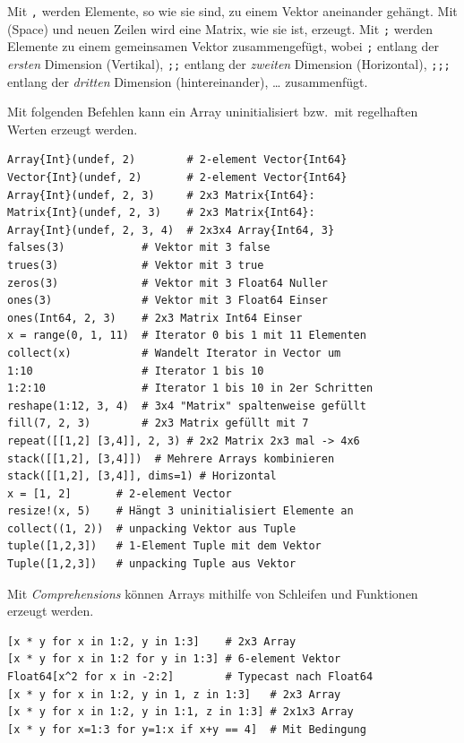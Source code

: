 \documentclass[10pt,twocolumn]{scrartcl}
\begin{document}
Mit \lstinline|,| werden Elemente, so wie sie sind, zu einem Vektor aneinander
gehängt. Mit \lstinline| | (Space) und neuen Zeilen wird eine Matrix, wie sie
ist, erzeugt. Mit \lstinline|;| werden Elemente zu einem gemeinsamen Vektor
zusammengefügt, wobei \lstinline|;| entlang der \emph{ersten} Dimension
(Vertikal), \lstinline|;;| entlang der \emph{zweiten} Dimension (Horizontal),
\lstinline|;;;| entlang der \emph{dritten} Dimension (hintereinander), \dots
zusammenfügt.

Mit folgenden Befehlen kann ein Array uninitialisiert bzw.\ mit regelhaften
Werten erzeugt werden.

\begin{lstlisting}
Array{Int}(undef, 2)        # 2-element Vector{Int64}
Vector{Int}(undef, 2)       # 2-element Vector{Int64}
Array{Int}(undef, 2, 3)     # 2x3 Matrix{Int64}:
Matrix{Int}(undef, 2, 3)    # 2x3 Matrix{Int64}:
Array{Int}(undef, 2, 3, 4)  # 2x3x4 Array{Int64, 3}
falses(3)            # Vektor mit 3 false
trues(3)             # Vektor mit 3 true
zeros(3)             # Vektor mit 3 Float64 Nuller
ones(3)              # Vektor mit 3 Float64 Einser
ones(Int64, 2, 3)    # 2x3 Matrix Int64 Einser
x = range(0, 1, 11)  # Iterator 0 bis 1 mit 11 Elementen
collect(x)           # Wandelt Iterator in Vector um
1:10                 # Iterator 1 bis 10
1:2:10               # Iterator 1 bis 10 in 2er Schritten
reshape(1:12, 3, 4)  # 3x4 "Matrix" spaltenweise gefüllt
fill(7, 2, 3)        # 2x3 Matrix gefüllt mit 7
repeat([[1,2] [3,4]], 2, 3) # 2x2 Matrix 2x3 mal -> 4x6
stack([[1,2], [3,4]])  # Mehrere Arrays kombinieren
stack([[1,2], [3,4]], dims=1) # Horizontal
x = [1, 2]       # 2-element Vector
resize!(x, 5)    # Hängt 3 uninitialisiert Elemente an
collect((1, 2))  # unpacking Vektor aus Tuple
tuple([1,2,3])   # 1-Element Tuple mit dem Vektor
Tuple([1,2,3])   # unpacking Tuple aus Vektor
\end{lstlisting}

Mit \emph{Comprehensions} können Arrays mithilfe von Schleifen und Funktionen erzeugt werden.

\begin{lstlisting}
[x * y for x in 1:2, y in 1:3]    # 2x3 Array
[x * y for x in 1:2 for y in 1:3] # 6-element Vektor
Float64[x^2 for x in -2:2]        # Typecast nach Float64
[x * y for x in 1:2, y in 1, z in 1:3]   # 2x3 Array
[x * y for x in 1:2, y in 1:1, z in 1:3] # 2x1x3 Array
[x * y for x=1:3 for y=1:x if x+y == 4]  # Mit Bedingung
\end{lstlisting}
\end{document}
